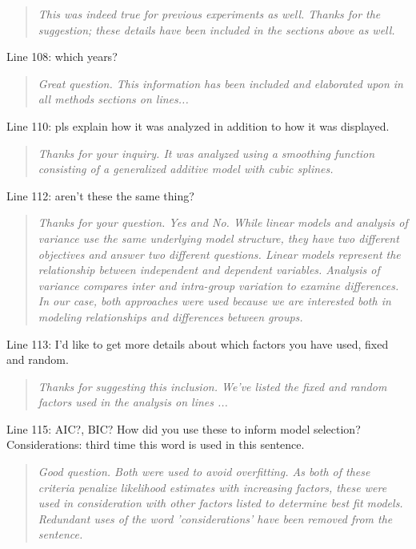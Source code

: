 \documentclass{article}
\begin{document}
\begin{quote}
    \textit{This was indeed true for previous experiments as well.  Thanks for the suggestion; these details have been included in the sections above as well.  }
\end{quote}

Line 108: which years?

\begin{quote}
    \textit{Great question.  This information has been included and elaborated upon in all methods sections on lines...}
\end{quote}

Line 110: pls explain how it was analyzed in addition to how it was displayed.

\begin{quote}
    \textit{Thanks for your inquiry.  It was analyzed using a smoothing function consisting of a generalized additive model with cubic splines.  }
\end{quote}

Line 112: aren't these the same thing?

\begin{quote}
    \textit{Thanks for your question.  Yes and No.  While linear models and analysis of variance use the same underlying model structure, they have two different objectives and answer two different questions.  Linear models represent the relationship between independent and dependent variables.  Analysis of variance compares inter and intra-group variation to examine differences.  In our case, both approaches were used because we are interested both in modeling relationships and differences between groups.  }
\end{quote}

Line 113: I'd like to get more details about which factors you have used, fixed and random.  

\begin{quote}
    \textit{Thanks for suggesting this inclusion.  We've listed the fixed and random factors used in the analysis on lines ...}
\end{quote}

Line 115: AIC?, BIC? How did you use these to inform model selection? Considerations: third time this word is used in this sentence.  

\begin{quote}
    \textit{Good question.  Both were used to avoid overfitting.  As both of these criteria penalize likelihood estimates with increasing factors, these were used in consideration with other factors listed to determine best fit models.  Redundant uses of the word 'considerations' have been removed from the sentence.  
    }
\end{quote}
\end{document}
